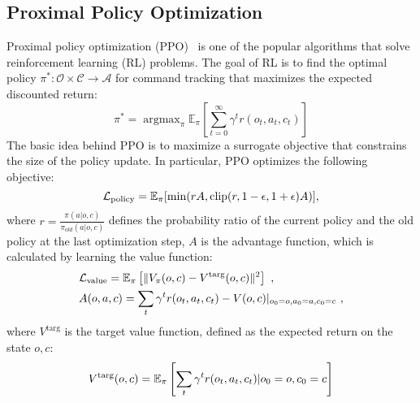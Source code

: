 \subsection{Proximal Policy Optimization}
Proximal policy optimization (PPO)~\citep{schulman2017proximal} is one of the popular algorithms that solve reinforcement learning (RL) problems. 
The goal of RL is to find the optimal policy $\pi^*: \mathcal{O} \times \mathcal{C} \to \mathcal{A}$ for command tracking that maximizes the expected discounted return:
\begin{equation}
    \pi ^{*} = \mathop{\arg \max}_{\pi} \mathbb E_{\pi}\left[\sum_{t=0}^{\infty} \gamma^t r(o_t, a_t, c_t)\right]
\end{equation}
The basic idea behind PPO is to maximize a surrogate objective that constrains the size of the policy update. In particular, PPO optimizes the following objective:
\begin{equation}
    \mathcal L_{\text{policy}} = \mathbb{E}_{\pi}[\min(rA, \text{clip}(r,1-\epsilon,1+\epsilon)A)],
\end{equation}
where $r=\frac{\pi(a|o,c)}{\pi_{old}(a|o,c)}$ defines the probability ratio of the current policy and the old policy at the last optimization step, $A$ is the advantage function, which is calculated by learning the value function:
\begin{equation}
\begin{aligned}
    &\mathcal L_{\text{value}} = \mathbb{E}_\pi\left[\|V_\pi(o,c) - V^{\text{targ}}(o,c)\|^2\right]~, \\
    &A(o,a,c) = \sum_{t} \gamma^t r(o_t,a_t,c_t) - V(o,c) |_{o_0=o,a_0=a,c_0=c}~,
\end{aligned}
\end{equation}
where $V^{\text{targ}}$ is the target value function, defined as the expected return on the state $o,c$:
\begin{equation}
    V^{\text{targ}}(o,c) = \mathbb{E}_{\pi}\left [\sum_{t} \gamma^t r(o_t,a_t,c_t) |o_0=o,c_0=c\right]
\end{equation}



